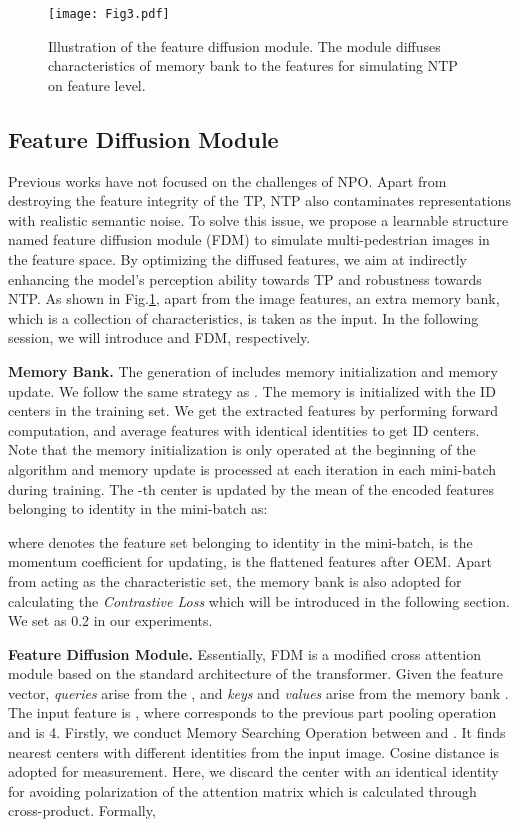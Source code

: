 \documentclass[10pt,twocolumn,letterpaper]{article}
\begin{document}
\begin{figure}[t]
  \centering
   \texttt{[image: Fig3.pdf]}
   \caption{Illustration of the feature diffusion module. The module diffuses characteristics of memory bank  to the features  for simulating NTP on feature level. 
   }
   \label{Fig3}
\end{figure}



\subsection{Feature Diffusion Module}
Previous works have not focused on the challenges of NPO. Apart from destroying the feature integrity of the TP, NTP also contaminates representations with realistic semantic noise. To solve this issue, we propose a learnable structure named feature diffusion module (FDM) to simulate multi-pedestrian images in the feature space. By optimizing the diffused features, we aim at indirectly enhancing the model's perception ability towards TP and robustness towards NTP. As shown in Fig.\ref{Fig3}, apart from the image features, an extra memory bank, which is a collection of characteristics, is taken as the input. In the following session, we will introduce  and FDM, respectively. 

\textbf{Memory Bank.}
The generation of  includes memory initialization and memory update. We follow the same strategy as \cite{ge2020self}. The memory is initialized with the ID centers in the training set. We get the extracted features by performing forward computation, and average features with identical identities to get ID centers. 
Note that the memory initialization is only operated at the beginning of the algorithm and memory update is processed at each iteration in each mini-batch during training. The -th center  is updated by the mean of the encoded features belonging to identity  in the mini-batch as:

where  denotes the feature set belonging to identity  in the mini-batch,  is the momentum coefficient for updating,  is the flattened features after OEM. Apart from acting as the characteristic set, the memory bank  is also adopted for calculating the \emph{Contrastive Loss} which will be introduced in the following section. 
We set  as 0.2 in our experiments. 


\textbf{Feature Diffusion Module.}
Essentially, FDM is a modified cross attention module based on the standard architecture of the transformer\cite{vaswani2017attention}. 
Given the feature vector, \emph{queries}  arise from the , and \emph{keys}  and \emph{values}  arise from the memory bank . 
The input feature is , where  corresponds to the previous part pooling operation and is 4.
Firstly, we conduct Memory Searching Operation between  and . It finds  nearest centers  with different identities from the input image. Cosine distance is adopted for measurement. Here, we discard the center with an identical identity for avoiding polarization of the attention matrix which is calculated through cross-product. 
Formally, 
\end{document}
